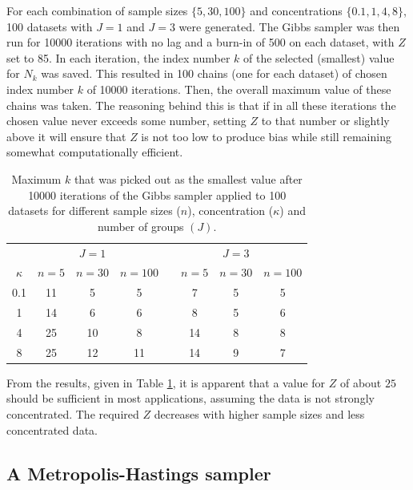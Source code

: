 \documentclass[]{gSCS2e}
\theoremstyle{plain}
\theoremstyle{definition}
\theoremstyle{remark}
\begin{document}
For each combination of sample sizes $\{5, 30, 100\}$ and concentrations $\{0.1, 1, 4, 8\}$, 100 datasets with $J=1$ and $J=3$ were generated. The Gibbs sampler was then run for 10000 iterations with no lag and a burn-in of 500 on each dataset, with $Z$ set to 85. In each iteration, the index number $k$ of the selected (smallest) value for $N_k$ was saved. This resulted in 100 chains (one for each dataset) of chosen index number $k$ of 10000 iterations. Then, the overall maximum value of these chains was taken. The reasoning behind this is that if in all these iterations the chosen value never exceeds some number, setting $Z$ to that number or slightly above it will ensure that $Z$ is not too low to produce bias while still remaining somewhat computationally efficient. 


\begin{table}[tb]
\centering
\caption{Maximum $k$ that was picked out as the smallest value after 10000 iterations of the Gibbs sampler applied to 100 datasets for different sample sizes ($n$), concentration ($\kappa$) and number of groups $(J)$.}
\label{tab:sufficientk}
\begin{tabular}{c@{\hskip 1.0cm}cccc@{\hskip 0.7cm}ccc}
  \toprule 
  & & $J=1$ & & & & $J=3$ & \\ 
   \cmidrule{2-4}
  $\kappa$ & $n=5$ & $n=30$ & $n=100$ & & $n=5$ & $n=30$ & $n=100$ \\ 
  \hline 
 0.1 & 11 & 5 & 5 &  & 7 & 5 & 5 \\ 
  1 & 14 & 6 & 6 &  & 8 & 5 & 6 \\ 
  4 & 25 & 10 & 8 &  & 14 & 8 & 8 \\ 
  8 & 25 & 12 & 11 &  & 14 & 9 & 7 \\ 
   \bottomrule 
\end{tabular}
\end{table}

From the results, given in Table \ref{tab:sufficientk}, it is apparent that a value for $Z$ of about $25$ should be sufficient in most applications, assuming the data is not strongly concentrated. The required $Z$ decreases with higher sample sizes and less concentrated data.



\subsection{A Metropolis-Hastings sampler \label{vmmh}}
\end{document}
